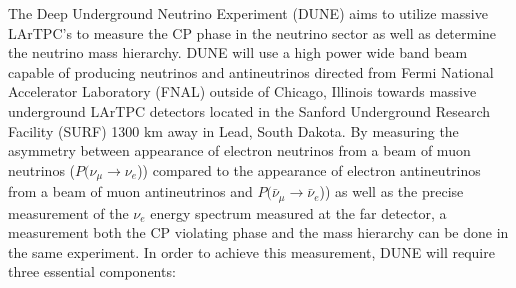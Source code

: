 \label{sec:IF_LBNProgram}
The Deep Underground Neutrino Experiment (DUNE) \cite{DUNE} aims to utilize massive LArTPC's to measure the CP phase in the neutrino sector as well as determine the neutrino mass hierarchy. DUNE will use a high power wide band beam capable of producing neutrinos and antineutrinos directed from Fermi National Accelerator Laboratory (FNAL) outside of Chicago, Illinois towards massive underground LArTPC detectors located in the Sanford Underground Research Facility (SURF) 1300 km away in Lead, South Dakota. By measuring the asymmetry between appearance of electron neutrinos from a beam of muon neutrinos ($P(\nu_{\mu} \rightarrow \nu_{e}$)) compared to the appearance of electron antineutrinos from a beam of muon antineutrinos and $P(\bar{\nu}_{\mu} \rightarrow \bar{\nu}_{e}$)) as well as the precise measurement of the $\nu_{e}$ energy spectrum measured at the far detector, a measurement both the CP violating phase and the mass hierarchy can be done in the same experiment. In order to achieve this measurement, DUNE will require three essential components:
